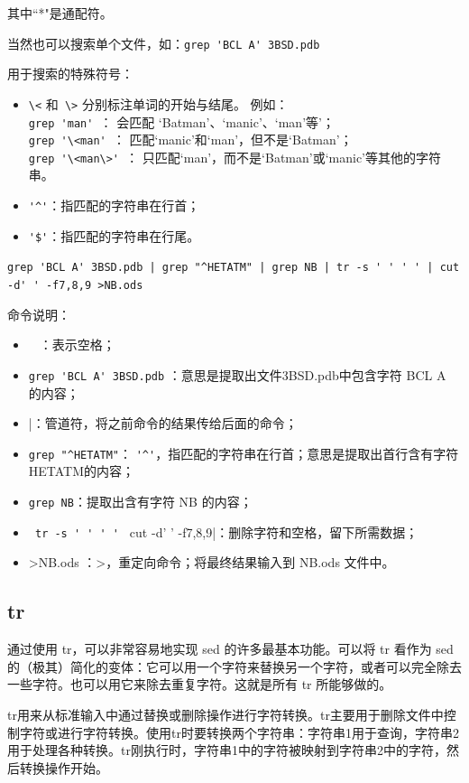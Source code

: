 其中``*"是通配符。

当然也可以搜索单个文件，如：\verb*[grep 'BCL A' 3BSD.pdb[

用于搜索的特殊符号：
\begin{itemize}
\item \verb|\<| 和\verb| \>| 分别标注单词的开始与结尾。 例如：\\ 
\verb|grep 'man' |： 会匹配 ‘Batman’、‘manic’、‘man’等'；\\
\verb|grep '\<man' |： 匹配‘manic’和‘man’，但不是‘Batman’；\\ 
\verb|grep '\<man\>' |： 只匹配‘man’，而不是‘Batman’或‘manic’等其他的字符串。 

\item \verb|'^'|：指匹配的字符串在行首；

\item \verb|'$'|：指匹配的字符串在行尾。
\end{itemize}


 \verb*[grep 'BCL A' 3BSD.pdb | grep "^HETATM" | grep NB | tr -s ' ' ' ' | cut -d' ' -f7,8,9 >NB.ods[ 

命令说明：
\begin{itemize}
\item \verb*| | ：表示空格；
\item \verb*[grep 'BCL A' 3BSD.pdb[ ：意思是提取出文件3BSD.pdb中包含字符 BCL A 的内容；
\item |：管道符，将之前命令的结果传给后面的命令；
\item \verb*[grep "^HETATM"[： \verb|'^'|，指匹配的字符串在行首；意思是提取出首行含有字符HETATM的内容；
\item \verb*|grep NB|：提取出含有字符 NB 的内容；
\item \verb*| tr -s ' ' ' ' | cut -d' ' -f7,8,9|：删除字符和空格，留下所需数据；
\item >NB.ods ：>，重定向命令；将最终结果输入到 NB.ods 文件中。
\end{itemize}




\subsection{tr}
通过使用 tr，可以非常容易地实现 sed 的许多最基本功能。可以将 tr 看作为 sed 的（极其）简化的变体：它可以用一个字符来替换另一个字符，或者可以完全除去一些字符。也可以用它来除去重复字符。这就是所有 tr 所能够做的。 


tr用来从标准输入中通过替换或删除操作进行字符转换。tr主要用于删除文件中控制字符或进行字符转换。使用tr时要转换两个字符串：字符串1用于查询，字符串2用于处理各种转换。tr刚执行时，字符串1中的字符被映射到字符串2中的字符，然后转换操作开始。

